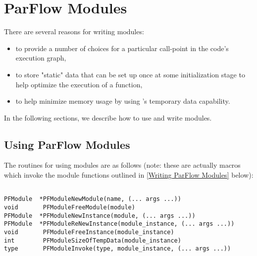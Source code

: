 
\chapter{ParFlow Modules}
\label{ParFlow Modules}

There are several reasons for writing \parflow{} modules:

\begin{itemize}

\item
to provide a number of choices for a particular call-point in
the code's execution graph,

\item
to store "static" data that can be set up once at some initialization
stage to help optimize the execution of a function,

\item
to help minimize memory usage by using \parflow{}'s temporary
data capability.

\end{itemize}

\noindent
In the following sections, we describe how to use and write
\parflow{} modules.


\section{Using ParFlow Modules}
\label{Using ParFlow Modules}

The routines for using \parflow{} modules are as follows
(note: these are actually macros which invoke the module
functions outlined in \ref{Writing ParFlow Modules} below):

\begin{display}\begin{verbatim}

PFModule  *PFModuleNewModule(name, (... args ...))
void       PFModuleFreeModule(module)
PFModule  *PFModuleNewInstance(module, (... args ...))
PFModule  *PFModuleReNewInstance(module_instance, (... args ...))
void       PFModuleFreeInstance(module_instance)
int        PFModuleSizeOfTempData(module_instance)
type       PFModuleInvoke(type, module_instance, (... args ...))

\end{verbatim}\end{display}

